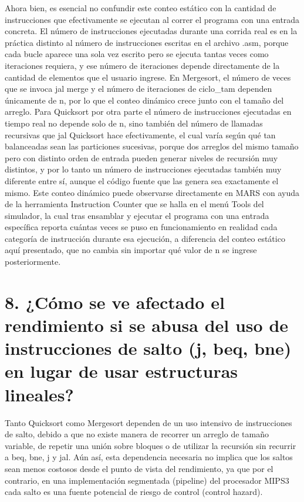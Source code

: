 \documentclass[12pt, letterpaper]{article}
\begin{document}
Ahora bien, es esencial no confundir este conteo estático con la cantidad de instrucciones que efectivamente se ejecutan al correr el programa con una entrada concreta. El número de instrucciones ejecutadas durante una corrida real es en la práctica distinto al número de instrucciones escritas en el archivo .asm, porque cada bucle aparece una sola vez escrito pero se ejecuta tantas veces como iteraciones requiera, y ese número de iteraciones depende directamente de la cantidad de elementos que el usuario ingrese. En Mergesort, el número de veces que se invoca jal merge y el número de iteraciones de ciclo\_tam dependen únicamente de n, por lo que el conteo dinámico crece junto con el tamaño del arreglo. Para Quicksort por otra parte el número de instrucciones ejecutadas en tiempo real no depende solo de n, sino también del número de llamadas recursivas que jal Quicksort hace efectivamente, el cual varía según qué tan balanceadas sean las particiones sucesivas, porque dos arreglos del mismo tamaño pero con distinto orden de entrada pueden generar niveles de recursión muy distintos, y por lo tanto un número de instrucciones ejecutadas también muy diferente entre sí, aunque el código fuente que las genera sea exactamente el mismo. Este conteo dinámico puede observarse directamente en MARS con ayuda de la herramienta Instruction Counter que se halla en el menú Tools del simulador, la cual tras ensamblar y ejecutar el programa con una entrada específica reporta cuántas veces se puso en funcionamiento en realidad cada categoría de instrucción durante esa ejecución, a diferencia del conteo estático aquí presentado, que no cambia sin importar qué valor de n se ingrese posteriormente.\newpage

\section*{8. ¿Cómo se ve afectado el rendimiento si se abusa del uso de instrucciones de salto (j, beq, bne) en lugar de usar estructuras lineales?}

Tanto Quicksort como Mergesort dependen de un uso intensivo de instrucciones de salto, debido a que no existe manera de recorrer un arreglo de tamaño variable, de repetir una unión sobre bloques o de utilizar la recursión sin recurrir a beq, bne, j y jal. Aún así, esta dependencia necesaria no implica que los saltos sean menos costosos desde el punto de vista del rendimiento, ya que por el contrario, en una implementación segmentada (pipeline) del procesador MIPS3 cada salto es una fuente potencial de riesgo de control (control hazard).
\end{document}
